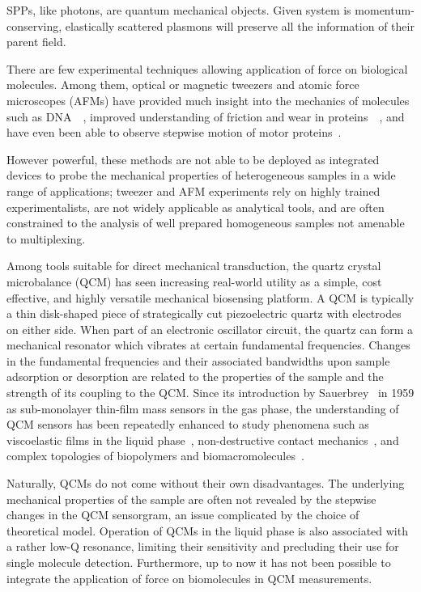 SPPs, like photons, are quantum mechanical objects.  Given system is
momentum-conserving, elastically scattered plasmons will preserve all the
information of their parent field.  

There are few experimental techniques allowing application of force on
biological molecules. Among them, optical or magnetic tweezers and atomic
force microscopes (AFMs) have provided much insight into the mechanics of
molecules such as DNA~\cite{cui2000pulling}~\cite{marko1995stretching},
improved understanding of friction and wear in
proteins~\cite{suda2001origin}~\cite{bormuth2009protein}, and have even
been able to observe stepwise motion of motor
proteins~\cite{asbury2003kinesin}.

However powerful, these methods are not able to be deployed as integrated
devices to probe the mechanical properties of heterogeneous samples in a
wide range of applications; tweezer and AFM experiments rely on highly
trained experimentalists, are not widely applicable as analytical tools,
and are often constrained to the analysis of well prepared homogeneous
samples not amenable to multiplexing.

Among tools suitable for direct mechanical transduction, the quartz crystal
microbalance (QCM) has seen increasing real-world utility as a simple, cost
effective, and highly versatile mechanical biosensing platform. A QCM is
typically a thin disk-shaped piece of strategically cut piezoelectric
quartz with electrodes on either side. When part of an electronic
oscillator circuit, the quartz can form a mechanical resonator which
vibrates at certain fundamental frequencies. Changes in the fundamental
frequencies and their associated bandwidths upon sample adsorption or
desorption are related to the properties of the sample and the strength of
its coupling to the QCM. Since its introduction by
Sauerbrey~\cite{sauerbrey1959verwendung} in 1959 as sub-monolayer thin-film
mass sensors in the gas phase, the understanding of QCM sensors has been
repeatedly enhanced to study phenomena such as viscoelastic films in the
liquid phase~\cite{kanazawa1985frequency}, non-destructive contact
mechanics~\cite{johannsman2007contacts}, and complex topologies of
biopolymers and biomacromolecules~\cite{marx2003quartz}. 

Naturally, QCMs do not come without their own disadvantages. The underlying
mechanical properties of the sample are often not revealed by the stepwise
changes in the QCM sensorgram, an issue complicated by the choice of
theoretical model.  Operation of QCMs in the liquid phase is also
associated with a rather low-Q resonance, limiting their sensitivity and
precluding their use for single molecule detection.  Furthermore, up to now
it has not been possible to integrate the application of force on
biomolecules in QCM measurements.

